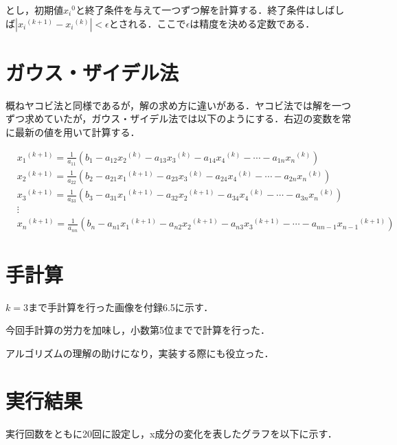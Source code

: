 \documentclass[a4paper, titlepage]{jsarticle}
\begin{document}
	とし，初期値${{x_{i}}^{0}}$と終了条件を与えて一つずつ解を計算する．終了条件はしばしば$|{{x_{i}}^{(k+1)}} - {{x_{i}}^{(k)}}| < {\epsilon}$とされる．ここで${\epsilon}$は精度を決める定数である．

	\section{ガウス・ザイデル法}
	概ねヤコビ法と同様であるが，解の求め方に違いがある．ヤコビ法では解を一つずつ求めていたが，ガウス・ザイデル法では以下のようにする．右辺の変数を常に最新の値を用いて計算する．

		\begin{eqnarray}
			&{{x_{1}}^{(k+1)}} = {\frac{1}{a_{11}}}({b_{1}} - {a_{12}}{{x_{2}}^{(k)}} - {a_{13}}{{x_{3}}^{(k)}} - {a_{14}}{{x_{4}}^{(k)}} - {\cdots} - {a_{1n}}{{x_{n}}^{(k)}}) \nonumber \\
			&{{x_{2}}^{(k+1)}} = {\frac{1}{a_{22}}}({b_{2}} - {a_{21}}{{x_{1}}^{(k+1)}} - {a_{23}}{{x_{3}}^{(k)}} - {a_{24}}{{x_{4}}^{(k)}} - {\cdots} - {a_{2n}}{{x_{n}}^{(k)}}) \nonumber \\
			&{{x_{3}}^{(k+1)}} = {\frac{1}{a_{33}}}({b_{3}} - {a_{31}}{{x_{1}}^{(k+1)}} - {a_{32}}{{x_{2}}^{(k+1)}} - {a_{34}}{{x_{4}}^{(k)}} - {\cdots} - {a_{3n}}{{x_{n}}^{(k)}}) \nonumber \\
			&{\vdots} \\
			&{{x_{n}}^{(k+1)}} = {\frac{1}{a_{nn}}}({b_{n}} - {a_{n1}}{{x_{1}}^{(k+1)}} - {a_{n2}}{{x_{2}}^{(k+1)}} - {a_{n3}}{{x_{3}}^{(k+1)}} - {\cdots} - {a_{nn-1}}{{x_{n-1}}^{(k+1)}})
		\end{eqnarray}

	\section{手計算}
	$k=3$まで手計算を行った画像を付録6.5に示す．

	今回手計算の労力を加味し，小数第5位までで計算を行った．

	アルゴリズムの理解の助けになり，実装する際にも役立った．

	\section{実行結果}
	実行回数をともに20回に設定し，x成分の変化を表したグラフを以下に示す．
\end{document}

